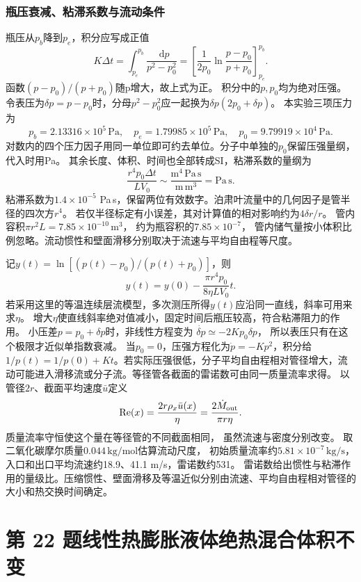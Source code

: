 \documentclass[UTF8,fontset=fandol,a4paper,11pt]{ctexart}
\newcommand{\dd}{\mathop{}\!\mathrm{d}}
\begin{document}
\subsubsection*{瓶压衰减、粘滞系数与流动条件}
瓶压从$p_b$降到$p_e$，积分应写成正值
\[
K\Delta t=\int_{p_e}^{p_b}\frac{\dd p}{p^2-p_0^2}
=\left[\frac1{2p_0}\ln\frac{p-p_0}{p+p_0}\right]_{p_e}^{p_b}.
\]
函数$(p-p_0)/(p+p_0)$随p增大，故上式为正。
积分中的$p,p_0$均为绝对压强。令表压为$\delta p=p-p_0$时，分母$p^2-p_0^2$应一起换为$\delta p(2p_0+\delta p)$。
本实验三项压力为
\[
p_b=2.13316\times10^5\,\mathrm{Pa},\quad
p_e=1.79985\times10^5\,\mathrm{Pa},\quad
p_0=9.79919\times10^4\,\mathrm{Pa}.
\]
对数内的四个压力因子用同一单位即可约去单位。分子中单独的$p_0$保留压强量纲，代入时用Pa。
其余长度、体积、时间也全部转成SI，粘滞系数的量纲为
\[
\frac{r^4p_0\Delta t}{LV_0}
\sim\frac{\mathrm{m^4\,Pa\,s}}{\mathrm{m\,m^3}}
=\mathrm{Pa\,s}.
\]
粘滞系数为$1.4\times10^{-5}$ Pa\,s，保留两位有效数字。泊肃叶流量中的几何因子是管半径的四次方$r^4$。
若仅半径标定有小误差，其对计算值的相对影响约为$4\delta r/r$。
管内容积$\pi r^2L=7.85\times10^{-10}\,\mathrm{m^3}$，
约为瓶容积的$7.85\times10^{-7}$，
管内储气量按小体积比例忽略。流动惯性和壁面滑移分别取决于流速与平均自由程等尺度。

记$y(t)=\ln[(p(t)-p_0)/(p(t)+p_0)]$，则
\[
y(t)=y(0)-\frac{\pi r^4p_0}{8\eta LV_0}t.
\]
若采用这里的等温连续层流模型，多次测压所得$y(t)$应沿同一直线，斜率可用来求$\eta$。
增大$\eta$使直线斜率绝对值减小，固定时间后瓶压较高，符合粘滞阻力的作用。
小压差$p=p_0+\delta p$时，非线性方程变为
$\dot{\delta p}\simeq-2Kp_0\delta p$，
所以表压只有在这个极限才近似单指数衰减。
当$p_0=0$，压强方程化为$\dot p=-Kp^2$，积分给$1/p(t)=1/p(0)+Kt$。若实际压强很低，分子平均自由程相对管径增大，流动可能进入滑移流或分子流。等径管各截面的雷诺数可由同一质量流率求得。
以管径$2r$、截面平均速度$\bar u$定义
\[
\mathrm{Re}(x)=\frac{2r\rho_x\bar u(x)}\eta
=\frac{2\dot M_{\rm out}}{\pi r\eta}.
\]
质量流率守恒使这个量在等径管的不同截面相同，
虽然流速与密度分别改变。
取二氧化碳摩尔质量$0.044\,\mathrm{kg/mol}$估算流动尺度，
初始质量流率约$5.81\times10^{-7}\,\mathrm{kg/s}$，
入口和出口平均流速约18.9、41.1 m/s，雷诺数约531。
雷诺数给出惯性与粘滞作用的量级比。压缩惯性、壁面滑移及等温近似分别由流速、平均自由程相对管径的大小和热交换时间确定。





\section*{第 22 题\quad 线性热膨胀液体绝热混合体积不变}
\end{document}
